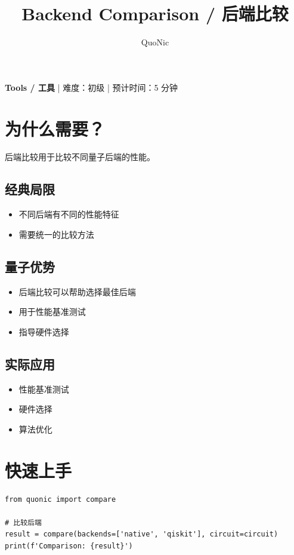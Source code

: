 \documentclass[12pt,a4paper]{article}
\title{Backend Comparison / 后端比较}
\author{QuoNic}
\date{}
\begin{document}
\maketitle

\begin{center}
\textbf{Tools / 工具} | 难度：初级 | 预计时间：5 分钟
\end{center}

\tableofcontents
\newpage

\section{为什么需要？}

后端比较用于比较不同量子后端的性能。

\subsection{经典局限}
\begin{itemize}
  \item 不同后端有不同的性能特征
  \item 需要统一的比较方法
\end{itemize}

\subsection{量子优势}
\begin{itemize}
  \item 后端比较可以帮助选择最佳后端
  \item 用于性能基准测试
  \item 指导硬件选择
\end{itemize}

\subsection{实际应用}
\begin{itemize}
  \item 性能基准测试
  \item 硬件选择
  \item 算法优化
\end{itemize}

\section{快速上手}

\begin{verbatim}
from quonic import compare

# 比较后端
result = compare(backends=['native', 'qiskit'], circuit=circuit)
print(f'Comparison: {result}')
\end{verbatim}
\end{document}
